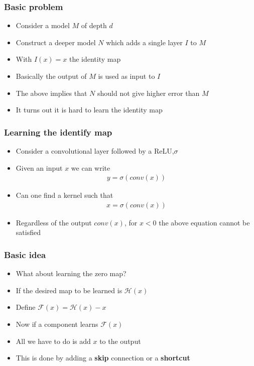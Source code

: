 \documentclass{beamer}
\begin{document}
\begin{frame}
    \frametitle{Basic problem}
\begin{itemize}
    \item Consider a model $M$ of depth $d$
    \item Construct a deeper model $N$ which adds a single layer $I$ to $M$
    \item With $I(x)=x$ the identity map
    \item Basically the output of $M$ is used as input to $I$
    \item The above implies that $N$ should not give higher error than $M$
    \item It turns out it is hard to learn the identity map
\end{itemize}
\end{frame}
\begin{frame}
    \frametitle{Learning the identify map}

\begin{itemize}
    \item Consider a convolutional layer followed by a ReLU,$\sigma$
    \item Given an input $x$ we can write
    \begin{align*}
        y=\sigma(conv(x))
    \end{align*}
    \item Can one find a kernel such that
    \begin{align*}
        x=\sigma(conv(x))
    \end{align*}
     \item  Regardless of the output $conv(x)$, for $x<0$ the above equation cannot be satisfied 
\end{itemize}    

\end{frame}
\begin{frame}
    \frametitle{Basic idea}
\begin{itemize}
    \item What about learning the zero map?
    \item If the desired map to be learned is $\mathcal{H}(x)$
    \item Define $\mathcal{F}(x)=\mathcal{H}(x)-x$
    \item Now if a component learns $\mathcal{F}(x)$
    \item All we have to do is add $x$ to the output
    \item This is done by adding a \textbf{skip} connection or a \textbf{shortcut}
\end{itemize}

\end{frame}
\end{document}
